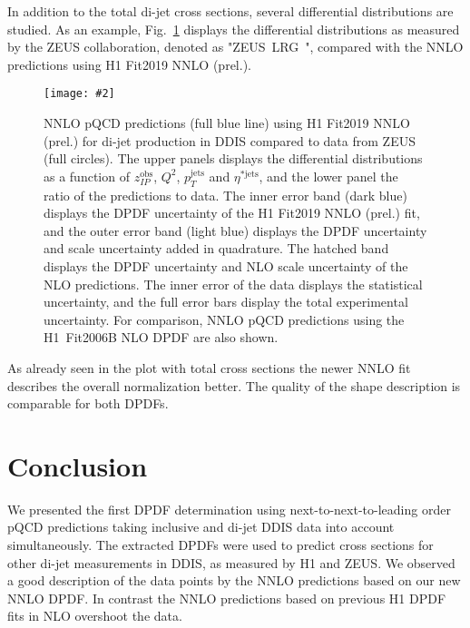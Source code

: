 \documentclass{PoS}
\makeatletter
\newcommand{\IP}{I\!\!P}
\newcommand{\includegraphicss}[2][]{\texttt{[image: \#2]}}
\newcommand*{\rom}[1]{\expandafter\@slowromancap\romannumeral #1@}
\newcommand{\HERAI} {\protect\scalebox{0.8}{(HERA~\rom{1})}}
\newcommand{\ZLRG}  {ZEUS~LRG~\HERAI\xspace}
\makeatother
\begin{document}
In addition to the total di-jet cross sections, several differential distributions are studied.
As an example, Fig.~\ref{figZEUSdiff} displays the differential distributions as measured by the ZEUS collaboration, denoted as "\ZLRG", compared with the NNLO predictions using H1 Fit2019 NNLO (prel.).
\begin{figure}[h]
\centering
\includegraphicss[trim={0cm 0.3cm 0 0.3cm},clip,width=.8\textwidth]{{{plots/H1prelim-19-013.fig7}}}
\caption{ NNLO pQCD predictions (full blue line) using H1 Fit2019 NNLO (prel.) for di-jet production in DDIS compared to data from ZEUS (full circles). The upper panels displays the differential distributions as a function of $z_{\IP}^\mathrm{obs}$, $Q^2$, $p_T^\mathrm{jets}$ and $\eta^{*\mathrm{jets}}$, and the lower panel the ratio of the predictions to data. The inner error band (dark blue) displays the DPDF uncertainty of the H1 Fit2019 NNLO (prel.) fit, and the outer error band (light blue) displays the DPDF uncertainty and scale uncertainty added in quadrature. The hatched band displays the DPDF uncertainty and NLO scale uncertainty of the NLO predictions. The inner error of the data displays the statistical uncertainty, and the full error bars display the total experimental uncertainty. For comparison, NNLO pQCD predictions using the H1~Fit2006B NLO DPDF are also shown.}
\label{figZEUSdiff}
\end{figure}
As already seen in the plot with total cross sections the newer NNLO fit describes the overall normalization better. The quality of the shape description is comparable for both DPDFs.

\section{Conclusion}
We presented the first DPDF determination using next-to-next-to-leading order pQCD predictions taking inclusive and di-jet DDIS data into account simultaneously.
The extracted DPDFs were used to predict cross sections for other di-jet measurements in DDIS, as measured by H1 and ZEUS.
We observed a good description of the data points by the NNLO predictions based on our new NNLO DPDF. In contrast the NNLO predictions based on previous H1 DPDF fits in NLO overshoot the data.




\end{document}
